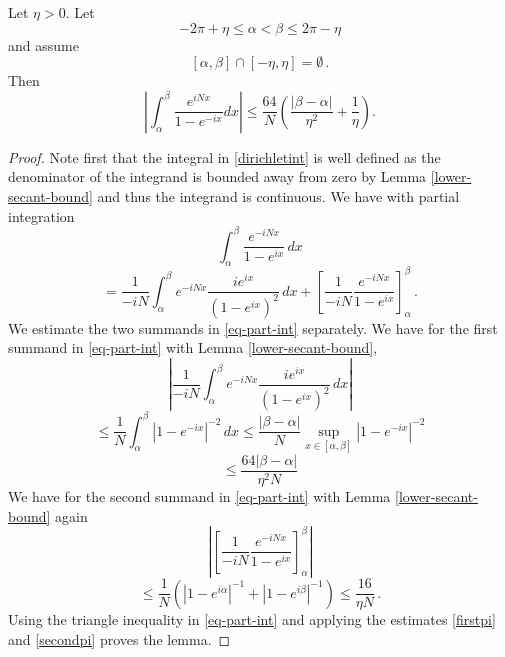 {\begin{lemma}
\label{dirichlet-kernel-bound}
Let $\eta>0$. Let
\begin{equation}
    -2\pi +\eta \le \alpha < \beta \le 2\pi-\eta
\end{equation}
and assume
\begin{equation}\label{eq-abdelta}
   [\alpha,\beta]\cap [-\eta,\eta]=\emptyset \, .
\end{equation}
Then
    \begin{equation}\label{dirichletint}
    \left|\int_\alpha^\beta
\frac {e^{iNx}} {1-e^{-ix}}
dx\right| \le \frac{64}N(\frac{|\beta-\alpha|}{\eta^2}+\frac 1{\eta}).
\end{equation}
\end{lemma}
\begin{proof}
 Note first that the integral in \eqref{dirichletint}
    is well defined as the denominator of the integrand is bounded away from zero by Lemma \ref{lower-secant-bound}
    and thus the integrand is continuous.
    We have with partial integration
\begin{equation*}
    \int_\alpha^\beta
\frac {e^{-iNx}} {1-e^{ix}}\,
dx
\end{equation*}
\begin{equation}\label{eq-part-int}
=\frac 1{-iN}\int_\alpha^\beta
{e^{-iNx}}\frac {ie^{ix}} {(1-e^{ix})^2}\, dx
+\left[ \frac 1{-iN}
\frac {e^{-iNx}} {1-e^{ix}}\right]_\alpha^\beta\, .
\end{equation}
We estimate the two summands in
\eqref{eq-part-int} separately. We have
for the first summand in \eqref{eq-part-int}
with Lemma \ref{lower-secant-bound},
\begin{equation*}
\left|   \frac 1 {-iN}\int_\alpha^\beta
{e^{-iNx}}\frac{ie^{ix}}
{(1-e^{ix})^2}\,
dx \right|
\end{equation*}
\begin{equation}\label{firstpi}
    \le \frac 1N \int_\alpha^\beta|1-e^{-ix}|^{-2} \, dx \le \frac {|\beta-\alpha|}N\sup_{x\in [\alpha,\beta]}|1-e^{-ix}|^{-2}
\end{equation}
\begin{equation}
    \le  \frac {64|\beta-\alpha|}{\eta^2N}
\end{equation}
We have for the second summand in \eqref{eq-part-int}
with Lemma \ref{lower-secant-bound} again
\begin{equation*}
   \left|\left[ \frac 1{-iN}
    \frac {e^{-iNx}} {1-e^{ix}}\right]_\alpha^\beta\right|
\end{equation*}
\begin{equation}\label{secondpi}
   \le \frac 1N (|1-e^{i\alpha}|^{-1}+|1-e^{i\beta}|^{-1})
    \le \frac {16}{\eta N}\, .
\end{equation}
Using the triangle inequality in \eqref{eq-part-int}
and applying the estimates \eqref{firstpi} and \eqref{secondpi}  proves the lemma.
\end{proof}



}

